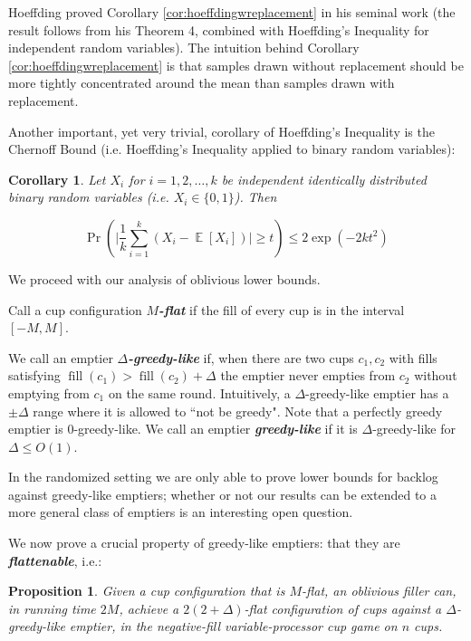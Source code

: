\documentclass[twocolumn]{article}[10pt]
\newcommand{\defn}[1]{{\textit{\textbf{\boldmath #1}}}\xspace}
\DeclareMathOperator{\E}{\mathbb{E}}
\DeclareMathOperator{\fil}{\text{fill}}
\newtheorem{proposition}{Proposition}
\newtheorem{corollary}{Corollary}
\begin{document}
Hoeffding proved Corollary \ref{cor:hoeffdingwreplacement} in his seminal work
\cite{who62} (the result follows from his Theorem 4, combined with Hoeffding's
Inequality for independent random variables).
The intuition behind Corollary \ref{cor:hoeffdingwreplacement} is that samples
drawn without replacement should be more tightly concentrated around the mean
than samples drawn with replacement.

Another important, yet very trivial, corollary of Hoeffding's Inequality is the
Chernoff Bound (i.e. Hoeffding's Inequality applied to binary random
variables):
\begin{corollary}
  \label{cor:chernoffbound}
  Let $X_i$ for $i=1,2,\ldots, k$ be independent identically distributed binary
  random variables (i.e. $X_i\in \{0,1\}$). Then 

  $$\Pr\left(\Big|\frac{1}{k} \sum_{i=1}^k (X_i - \E[X_i])\Big|\ge t\right) \le
  2\exp\left(-2kt^2 \right) $$
\end{corollary}

We proceed with our analysis of oblivious lower bounds.

Call a cup configuration $M$\defn{-flat} if the fill of every cup is in the
interval $[-M, M]$.

We call an emptier $\Delta$\defn{-greedy-like} if, when there are two cups
$c_1, c_2$ with fills satisfying $\fil(c_1) > \fil(c_2) + \Delta$ the emptier
never empties from $c_2$ without emptying from $c_1$ on the same round.
Intuitively, a $\Delta$-greedy-like emptier has a $\pm \Delta$ range where it
is allowed to ``not be greedy". Note that a perfectly greedy emptier is
$0$-greedy-like. We call an emptier \defn{greedy-like} if it is
$\Delta$-greedy-like for $\Delta \le O(1)$.

In the randomized setting we are only able to prove lower bounds for backlog
against greedy-like emptiers; whether or not our results can be extended to a
more general class of emptiers is an interesting open question. 

We now prove a crucial property of greedy-like emptiers: that they are \defn{flattenable}, i.e.:
\begin{proposition}
  \label{prop:greedylikeisflat}
  Given a cup configuration that is $M$-flat, an oblivious filler can, in
  running time $2M$, achieve a $2(2+\Delta)$-flat configuration of cups against
  a $\Delta$-greedy-like emptier, in the negative-fill variable-processor cup game on $n$ cups.
\end{proposition}
\end{document}
